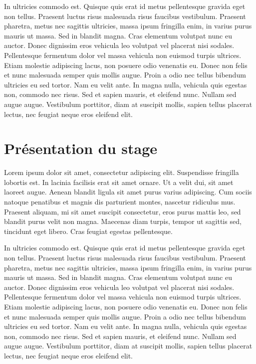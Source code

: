 \documentclass[a4paper,12pt]{report}
\begin{document}
In ultricies commodo est. Quisque quis erat id metus pellentesque
gravida eget non tellus. Praesent luctus risus malesuada risus
faucibus vestibulum. Praesent pharetra, metus nec sagittis ultricies,
massa ipsum fringilla enim, in varius purus mauris ut massa. Sed in
blandit magna. Cras elementum volutpat nunc eu auctor. Donec dignissim
eros vehicula leo volutpat vel placerat nisi sodales. Pellentesque
fermentum dolor vel massa vehicula non euismod turpis ultrices. Etiam
molestie adipiscing lacus, non posuere odio venenatis eu. Donec non
felis et nunc malesuada semper quis mollis augue. Proin a odio nec
tellus bibendum ultricies eu sed tortor. Nam eu velit ante. In magna
nulla, vehicula quis egestas non, commodo nec risus. Sed et sapien
mauris, et eleifend nunc. Nullam sed augue augue. Vestibulum
porttitor, diam at suscipit mollis, sapien tellus placerat lectus, nec
feugiat neque eros eleifend elit.

\chapter{Présentation du stage}
Lorem ipsum dolor sit amet, consectetur adipiscing elit. Suspendisse
fringilla lobortis est. In lacinia facilisis erat sit amet ornare. Ut
a velit dui, sit amet laoreet augue. Aenean blandit ligula sit amet
purus varius adipiscing. Cum sociis natoque penatibus et magnis dis
parturient montes, nascetur ridiculus mus. Praesent aliquam, mi sit
amet suscipit consectetur, eros purus mattis leo, sed blandit purus
velit non magna. Maecenas diam turpis, tempor ut sagittis sed,
tincidunt eget libero. Cras feugiat egestas pellentesque.

In ultricies commodo est. Quisque quis erat id metus pellentesque
gravida eget non tellus. Praesent luctus risus malesuada risus
faucibus vestibulum. Praesent pharetra, metus nec sagittis ultricies,
massa ipsum fringilla enim, in varius purus mauris ut massa. Sed in
blandit magna. Cras elementum volutpat nunc eu auctor. Donec dignissim
eros vehicula leo volutpat vel placerat nisi sodales. Pellentesque
fermentum dolor vel massa vehicula non euismod turpis ultrices. Etiam
molestie adipiscing lacus, non posuere odio venenatis eu. Donec non
felis et nunc malesuada semper quis mollis augue. Proin a odio nec
tellus bibendum ultricies eu sed tortor. Nam eu velit ante. In magna
nulla, vehicula quis egestas non, commodo nec risus. Sed et sapien
mauris, et eleifend nunc. Nullam sed augue augue. Vestibulum
porttitor, diam at suscipit mollis, sapien tellus placerat lectus, nec
feugiat neque eros eleifend elit.
\end{document}
